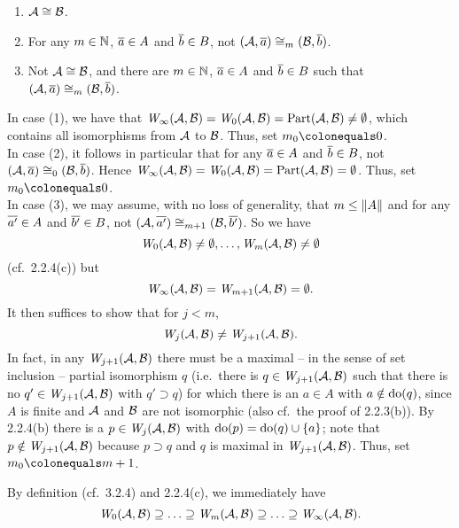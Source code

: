 \begin{enumerate}[1.]
\begin{enumerate}[(1)]
\item $\strct{A} \isom \strct{B}$.
\item For any $m \in \mathbb{N}$, $\overline{a} \in A$ and $\overline{b} \in B$, not $(\strct{A}, \vect{a}) \isom_m (\strct{B}, \vect{b})$.
\item Not $\strct{A} \isom \strct{B}$, and there are $m \in \mathbb{N}$, $\overline{a} \in A$ and $\overline{b} \in B$ such that $(\strct{A}, \vect{a}) \isom_m (\strct{B}, \vect{b})$.
\end{enumerate}
In case (1), we have that $\winpos{\infty}(\strct{A}, \strct{B}) = \winpos{0}(\strct{A}, \strct{B}) = \partisoms(\strct{A}, \strct{B}) \neq \emptyset$, which contains all isomorphisms from $\mathcal{A}$ to $\mathcal{B}$. Thus, set $m_0 \defas 0$.
\medskip\\
In case (2), it follows in particular that for any $\overline{a} \in A$ and $\overline{b} \in B$, not $(\strct{A}, \vect{a}) \isom_0 (\strct{B}, \vect{b})$. Hence $\winpos{\infty}(\strct{A}, \strct{B}) = \winpos{0}(\strct{A}, \strct{B}) = \partisoms(\strct{A}, \strct{B}) = \emptyset$. Thus, set $m_0 \defas 0$.
\medskip\\
In case (3), we may assume, with no loss of generality, that $m \leq \|A\|$ and for any $\overline{a'} \in A$ and $\overline{b'} \in B$, not $(\strct{A}, \vect{a'}) \isom_{m + 1} (\strct{B}, \vect{b'})$. So we have
\[
\winpos{0}(\strct{A}, \strct{B}) \neq \emptyset, \etc, \winpos{m}(\strct{A}, \strct{B}) \neq \emptyset
\]
(cf.\ 2.2.4(c)) but
\[
\winpos{\infty}(\strct{A}, \strct{B}) = \winpos{m + 1}(\strct{A}, \strct{B}) = \emptyset.
\]
It then suffices to show that for $j < m$, 
\[
\winpos{j}(\strct{A}, \strct{B}) \neq \winpos{j + 1}(\strct{A}, \strct{B}).
\]
In fact, in any $\winpos{j + 1}(\strct{A}, \strct{B})$ there must be a maximal -- in the sense of set inclusion -- partial isomorphism $q$ (i.e.\ there is $q \in \winpos{j + 1}(\strct{A}, \strct{B})$ such that there is no $q' \in \winpos{j + 1}(\strct{A}, \strct{B})$ with $q' \supset q$) for which there is an $a \in A$ with $a \notin \mathrm{do}(q)$, since $A$ is finite and $\mathcal{A}$ and $\mathcal{B}$ are not isomorphic (also cf.\ the proof of 2.2.3(b)). By 2.2.4(b) there is a $p \in \winpos{j}(\strct{A}, \strct{B})$ with $\mathrm{do}(p) = \mathrm{do}(q) \cup {\{a\}}$; note that $p \notin \winpos{j + 1}(\strct{A}, \strct{B})$ because $p \supset q$ and $q$ is maximal in $\winpos{j + 1}(\strct{A}, \strct{B})$. Thus, set $m_0 \defas m + 1$.
\begin{remark}
By definition (cf.\ 3.2.4) and 2.2.4(c), we immediately have
\[
\winpos{0}(\strct{A}, \strct{B}) \supseteq \etc \supseteq \winpos{m}(\strct{A}, \strct{B}) \supseteq \etc \supseteq \winpos{\infty}(\strct{A}, \strct{B}).
\]
\end{remark}
%
\end{enumerate}


